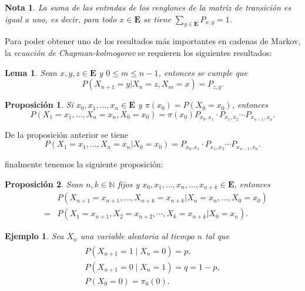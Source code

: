 \documentclass{article}
\newtheorem{Ejem}{Ejemplo}[section]
\newtheorem{Note}{Nota}[section]
\newtheorem{Prop}{Proposición}[section]
\newtheorem{Lema}{Lema}[section]
\newcommand{\nat}{\mathbb{N}}
\newcommand{\Eb}{\mathbf{E}}
\numberwithin{equation}{section}
\begin{document}
\begin{Note}
La suma de las entradas de los renglones de la matriz de transici\'on es igual a uno, es decir, para todo $x\in \mathbf{E}$ se tiene $\sum_{y\in\mathbf{E}}P_{x,y}=1$.
\end{Note}

Para poder obtener uno de los resultados m\'as importantes en cadenas de Markov, la \textit{ecuaci\'on de Chapman-kolmogorov} se requieren los siguientes resultados:

\begin{Lema}
Sean $x,y,z\in\Eb$ y $0\leq m\leq n-1$, entonces se cumple que
\begin{equation}
P\left(X_{n+1}=y|X_{n}=z,X_{m}=x\right)=P_{z,y}.
\end{equation}
\end{Lema}


\begin{Prop}
Si $x_{0},x_{1},\ldots,x_{n}\in \Eb$ y $\pi\left(x_{0}\right)=P\left(X_{0}=x_{0}\right)$, entonces
\begin{equation}
P\left(X_{1}=x_{1},\ldots,X_{n}=x_{n},X_{0}=x_{0}\right)=\pi\left(x_{0}\right)P_{x_{0},x_{1}}\cdot P_{x_{1},x_{2}}\cdots P_{x_{n-1},x_{n}}.
\end{equation}
\end{Prop}

De la proposici\'on anterior se tiene
\begin{equation}
P\left(X_{1}=x_{1},\ldots,X_{n}=x_{n}|X_{0}=x_{0}\right)=P_{x_{0},x_{1}}\cdot P_{x_{1},x_{2}}\cdots P_{x_{n-1},x_{n}}.
\end{equation}

finalmente tenemos la siguiente proposici\'on:

\begin{Prop}
Sean $n,k\in\nat$ fijos y $x_{0},x_{1},\ldots,x_{n},\ldots,x_{n+k}\in\Eb$, entonces
\begin{eqnarray*}
&&P\left(X_{n+1}=x_{n+1},\ldots,X_{n+k}=x_{n+k}|X_{n}=x_{n},\ldots,X_{0}=x_{0}\right)\\
&=&P\left(X_{1}=x_{n+1},X_{2}=x_{n+2},\cdots,X_{k}=x_{n+k}|X_{0}=x_{n}\right).
\end{eqnarray*}
\end{Prop}


\begin{Ejem}
Sea $X_{n}$ una variable aleatoria al tiempo $n$ tal que
\begin{eqnarray}
\begin{array}{l}
P\left(X_{n+1}=1 \mid X_{n}=0\right)=p,\\
P\left(X_{n+1}=0 \mid X_{n}=1\right)=q=1-p,\\
P\left(X_{0}=0\right)=\pi_{0}\left(0\right).
\end{array}
\end{eqnarray}

\end{Ejem}
\end{document}
